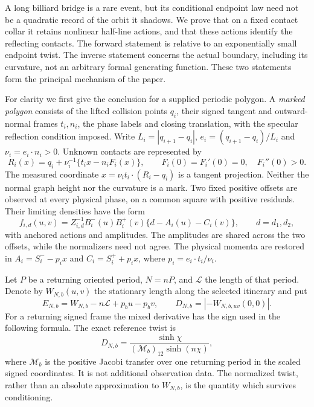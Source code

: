 A long billiard bridge is a rare event, but its conditional endpoint law
need not be a quadratic record of the orbit it shadows.  We prove that
on a fixed contact collar it retains nonlinear half-line actions, and
that these actions identify the reflecting contacts.  The forward
statement is relative to an exponentially small endpoint twist.  The
inverse statement concerns the actual boundary, including its curvature,
not an arbitrary formal generating function.  These two statements form
the principal mechanism of the paper.

For clarity we first give the conclusion for a supplied periodic polygon.
A \emph{marked polygon} consists of the lifted collision points $q_i$,
their signed tangent and outward-normal frames $t_i,n_i$, the phase labels
and closing translation, with the specular reflection condition imposed.
Write $L_i=|q_{i+1}-q_i|$, $e_i=(q_{i+1}-q_i)/L_i$ and
$\nu_i=e_i\cdot n_i>0$.  Unknown contacts are represented by
\[
 R_i(x)=q_i+\nu_i^{-1}\{t_i x-n_iF_i(x)\},\qquad
 F_i(0)=F_i'(0)=0,\quad F_i''(0)>0.
\]
The measured coordinate $x=\nu_i t_i\cdot(R_i-q_i)$ is a tangent
projection.  Neither the normal graph height nor the curvature is a mark.
Two fixed positive offsets are observed at every physical phase, on a
common square with positive residuals.  Their limiting densities have
the form
\[
 f_{i,d}(u,v)=Z_{i,d}^{-1}B_i^-(u)B_i^+(v)
              \{d-A_i(u)-C_i(v)\},\qquad d=d_1,d_2,
\]
with anchored actions and amplitudes.  The amplitudes are shared across
the two offsets, while the normalizers need not agree.  The physical
momenta are restored in $A_i=S_i^- -p_i x$ and
$C_i=S_i^+ +p_i x$, where $p_i=e_i\cdot t_i/\nu_i$.

Let $P$ be a returning oriented period, $N=nP$, and $\mathcal L$
the length of that period.  Denote by $W_{N,b}(u,v)$ the stationary
length along the selected itinerary and put
\[
 E_{N,b}=W_{N,b}-n\mathcal L+p_bu-p_bv,\qquad
 D_{N,b}=|-W_{N,b,uv}(0,0)|.
\]
For a returning signed frame the mixed derivative has the sign used in
the following formula.  The exact reference twist is
\[
 D_{N,b}=\frac{\sinh\chi}
 { (\mathcal M_b)_{12}\sinh(n\chi)},
\]
where $\mathcal M_b$ is the positive Jacobi transfer over one returning
period in the scaled signed coordinates.  It is not additional
observation data.  The normalized twist, rather than an absolute
approximation to $W_{N,b}$, is the quantity which survives conditioning.

